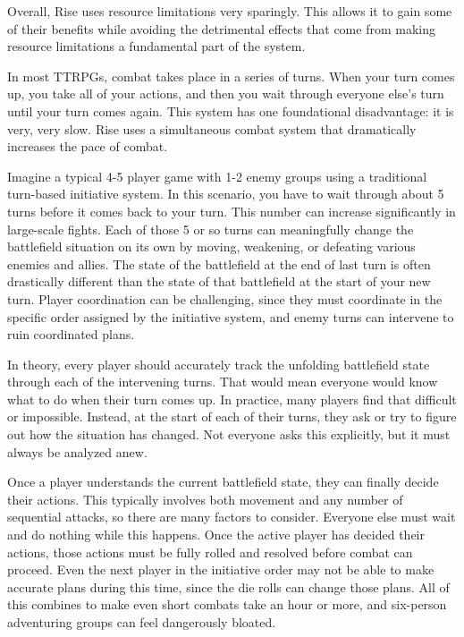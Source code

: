     Overall, Rise uses resource limitations very sparingly.
    This allows it to gain some of their benefits while avoiding the detrimental effects that come from making resource limitations a fundamental part of the system.

    In most TTRPGs, combat takes place in a series of turns.
    When your turn comes up, you take all of your actions, and then you wait through everyone else's turn until your turn comes again.
    This system has one foundational disadvantage: it is very, very slow.
    Rise uses a simultaneous combat system that dramatically increases the pace of combat.

    Imagine a typical 4-5 player game with 1-2 enemy groups using a traditional turn-based initiative system.
    In this scenario, you have to wait through about 5 turns before it comes back to your turn.
    This number can increase significantly in large-scale fights.
    Each of those 5 or so turns can meaningfully change the battlefield situation on its own by moving, weakening, or defeating various enemies and allies.
    The state of the battlefield at the end of last turn is often drastically different than the state of that battlefield at the start of your new turn.
    Player coordination can be challenging, since they must coordinate in the specific order assigned by the initiative system, and enemy turns can intervene to ruin coordinated plans.

    In theory, every player should accurately track the unfolding battlefield state through each of the intervening turns.
    That would mean everyone would know what to do when their turn comes up.
    In practice, many players find that difficult or impossible.
    Instead, at the start of each of their turns, they ask or try to figure out how the situation has changed.
    Not everyone asks this explicitly, but it must always be analyzed anew.

    Once a player understands the current battlefield state, they can finally decide their actions.
    This typically involves both movement and any number of sequential attacks, so there are many factors to consider.
    Everyone else must wait and do nothing while this happens.
    Once the active player has decided their actions, those actions must be fully rolled and resolved before combat can proceed.
    Even the next player in the initiative order may not be able to make accurate plans during this time, since the die rolls can change those plans.
    All of this combines to make even short combats take an hour or more, and six-person adventuring groups can feel dangerously bloated.


